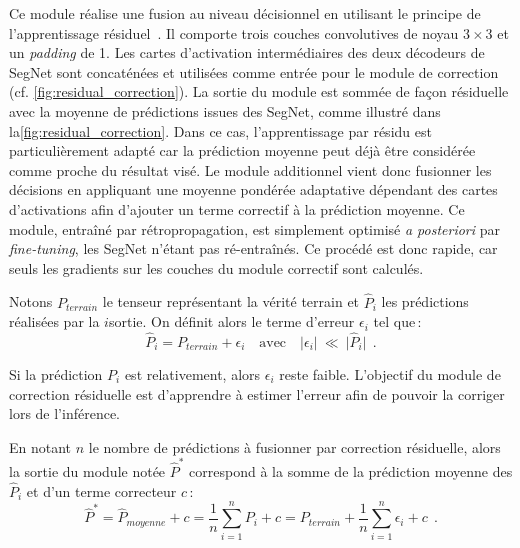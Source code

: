 Ce module réalise une fusion au niveau décisionnel en utilisant le principe de l'apprentissage résiduel~\cite{he_deep_2016}. Il comporte trois couches convolutives de noyau $3\times3$ et un \emph{padding} de \SI{1}{\px}. Les cartes d'activation intermédiaires des deux décodeurs de SegNet sont concaténées et utilisées comme entrée pour le module de correction (cf. \cref{fig:residual_correction}). La sortie du module est sommée de façon résiduelle avec la moyenne de prédictions issues des SegNet, comme illustré dans la\cref{fig:residual_correction}. Dans ce cas, l'apprentissage par résidu est particulièrement adapté car la prédiction moyenne peut déjà être considérée comme proche du résultat visé. Le module additionnel vient donc fusionner les décisions en appliquant une moyenne pondérée adaptative dépendant des cartes d'activations afin d'ajouter un terme correctif à la prédiction moyenne. Ce module, entraîné par rétropropagation, est simplement optimisé \emph{a posteriori} par \emph{fine-tuning}, les SegNet n'étant pas ré-entraînés. Ce procédé est donc rapide, car seuls les gradients sur les couches du module correctif sont calculés.



Notons $P_\mathit{terrain}$ le tenseur représentant la vérité terrain et $\hat{P}_i$ les prédictions réalisées par la $i$\ieme sortie. On définit alors le terme d'erreur $\epsilon_i$ tel que\,:
\begin{equation}
\hat{P}_i = P_\mathit{terrain} + \epsilon_i \text{~~~avec~~~} \lvert \epsilon_i \lvert ~\ll~ \rvert \hat{P}_i \rvert~~.
\end{equation}

Si la prédiction $P_i$ est relativement, alors $\epsilon_i$ reste faible. L'objectif du module de correction résiduelle est d'apprendre à estimer l'erreur afin de pouvoir la corriger lors de l'inférence.

En notant $n$ le nombre de prédictions à fusionner par correction résiduelle, alors la sortie du module notée $\hat{P}^*$ correspond à la somme de la prédiction moyenne des $\hat{P}_i$ et d'un terme correcteur $c$\,:
\begin{equation}
\hat{P}^* = \hat{P}_\mathit{moyenne} + c = \frac{1}{n} \sum_{i=1}^n P_i + c = P_\mathit{terrain} + \frac{1}{n} \sum_{i=1}^n \epsilon_i + c~~.
\end{equation}

